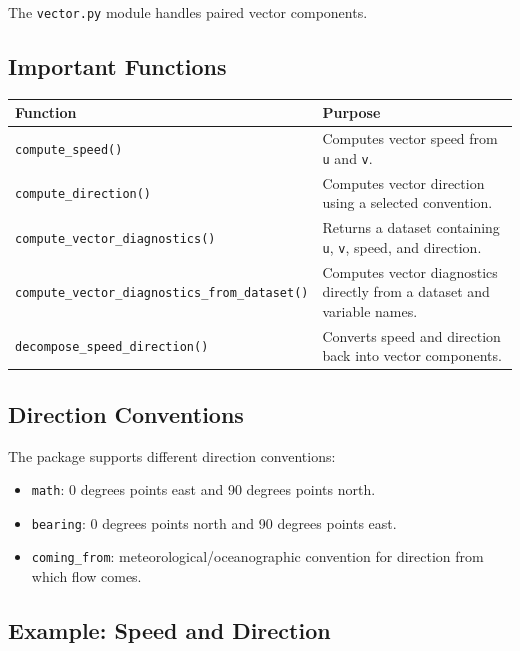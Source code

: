 \documentclass[11pt,a4paper]{article}
\begin{document}
The \texttt{vector.py} module handles paired vector components.

\subsection{Important Functions}

\begin{longtable}{p{}p{}}
\toprule
\textbf{Function} & \textbf{Purpose} \\
\midrule
\endhead

\texttt{compute\_speed()} &
Computes vector speed from \texttt{u} and \texttt{v}. \\

\texttt{compute\_direction()} &
Computes vector direction using a selected convention. \\

\texttt{compute\_vector\_diagnostics()} &
Returns a dataset containing \texttt{u}, \texttt{v}, speed, and direction. \\

\texttt{compute\_vector\_diagnostics\_from\_dataset()} &
Computes vector diagnostics directly from a dataset and variable names. \\

\texttt{decompose\_speed\_direction()} &
Converts speed and direction back into vector components. \\

\bottomrule
\end{longtable}

\subsection{Direction Conventions}

The package supports different direction conventions:

\begin{itemize}
    \item \texttt{math}: 0 degrees points east and 90 degrees points north.
    \item \texttt{bearing}: 0 degrees points north and 90 degrees points east.
    \item \texttt{coming\_from}: meteorological/oceanographic convention for direction from which flow comes.
\end{itemize}

\subsection{Example: Speed and Direction}
\end{document}
